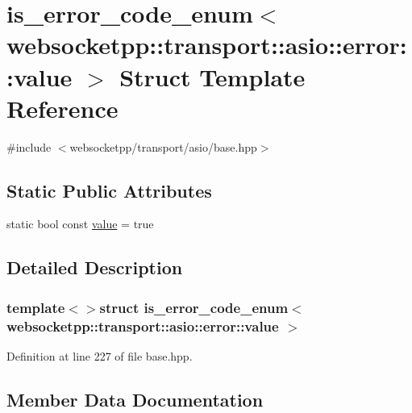 \hypertarget{structis__error__code__enum_3_01websocketpp_1_1transport_1_1asio_1_1error_1_1value_01_4}{}\section{is\+\_\+error\+\_\+code\+\_\+enum$<$ websocketpp\+:\+:transport\+:\+:asio\+:\+:error\+:\+:value $>$ Struct Template Reference}
\label{structis__error__code__enum_3_01websocketpp_1_1transport_1_1asio_1_1error_1_1value_01_4}


{\ttfamily \#include $<$websocketpp/transport/asio/base.\+hpp$>$}

\subsection*{Static Public Attributes}
\begin{DoxyCompactItemize}
\item 
static bool const \hyperlink{structis__error__code__enum_3_01websocketpp_1_1transport_1_1asio_1_1error_1_1value_01_4_aae5dbb38b63c54b30712a8d9437b4aeb}{value} = true
\end{DoxyCompactItemize}


\subsection{Detailed Description}
\subsubsection*{template$<$$>$struct is\+\_\+error\+\_\+code\+\_\+enum$<$ websocketpp\+::transport\+::asio\+::error\+::value $>$}



Definition at line 227 of file base.\+hpp.



\subsection{Member Data Documentation}
\hypertarget{structis__error__code__enum_3_01websocketpp_1_1transport_1_1asio_1_1error_1_1value_01_4_aae5dbb38b63c54b30712a8d9437b4aeb}{}
